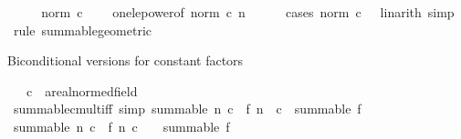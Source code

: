\begin{isabellebody}
\ \ \isamarkupfalse%
\ \isamarkupfalse%
\ {\isachardoublequoteopen}norm\ c\ {\isacharless}{\kern0pt}\ {}{\isachardoublequoteclose}\ \isamarkupfalse%
\ one{\isacharunderscore}{\kern0pt}le{\isacharunderscore}{\kern0pt}power{\isacharbrackleft}{\kern0pt}of\ {\isachardoublequoteopen}norm\ c{\isachardoublequoteclose}\ n{\isacharbrackright}{\kern0pt}\isanewline
\ \ \ \ \isamarkupfalse%
\ {\isacharparenleft}{\kern0pt}cases\ {\isachardoublequoteopen}norm\ c\ {\isasymge}\ {}{\isachardoublequoteclose}{\isacharparenright}{\kern0pt}\ {\isacharparenleft}{\kern0pt}linarith{\isacharcomma}{\kern0pt}\ simp{\isacharparenright}{\kern0pt}\isanewline
{}\isamarkupfalse%
\ {\isacharparenleft}{\kern0pt}rule\ summable{\isacharunderscore}{\kern0pt}geometric{\isacharparenright}{\kern0pt}%
\endisatagproof
{\isafoldproof}%
%
\isadelimproof
\isanewline
%
\endisadelimproof
\isanewline
{}\isamarkupfalse%
%
\begin{isamarkuptext}%
Biconditional versions for constant factors%
\end{isamarkuptext}\isamarkuptrue%
\isamarkupfalse%
\isanewline
\ \ \ c\ {\isacharcolon}{\kern0pt}{\isacharcolon}{\kern0pt}\ {\isachardoublequoteopen}{\isacharprime}{\kern0pt}a{\isacharcolon}{\kern0pt}{\isacharcolon}{\kern0pt}real{\isacharunderscore}{\kern0pt}normed{\isacharunderscore}{\kern0pt}field{\isachardoublequoteclose}\isanewline
{}\isanewline
\isanewline
{}\isamarkupfalse%
\ summable{\isacharunderscore}{\kern0pt}cmult{\isacharunderscore}{\kern0pt}iff\ {\isacharbrackleft}{\kern0pt}simp{\isacharbrackright}{\kern0pt}{\isacharcolon}{\kern0pt}\ {\isachardoublequoteopen}summable\ {\isacharparenleft}{\kern0pt}{\isasymlambda}n{\isachardot}{\kern0pt}\ c\ {\isacharasterisk}{\kern0pt}\ f\ n{\isacharparenright}{\kern0pt}\ {\isasymlongleftrightarrow}\ c{\isacharequal}{\kern0pt}{}\ {\isasymor}\ summable\ f{\isachardoublequoteclose}\isanewline
%
\isadelimproof
%
\endisadelimproof
%
\isatagproof
{}\isamarkupfalse%
\ {\isacharminus}{\kern0pt}\isanewline
\ \ \isamarkupfalse%
\ {\isachardoublequoteopen}{\isasymlbrakk}summable\ {\isacharparenleft}{\kern0pt}{\isasymlambda}n{\isachardot}{\kern0pt}\ c\ {\isacharasterisk}{\kern0pt}\ f\ n{\isacharparenright}{\kern0pt}{\isacharsemicolon}{\kern0pt}\ c\ {\isasymnoteq}\ {}{\isasymrbrakk}\ {\isasymLongrightarrow}\ summable\ f{\isachardoublequoteclose}\isanewline
\ \ \ \ \isamarkupfalse%

\end{isabellebody}
